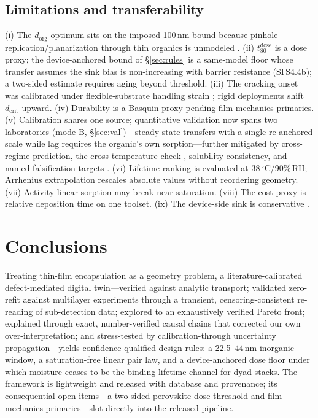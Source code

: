 \documentclass[11pt]{article}
\newcommand{\dorg}{d_{\mathrm{org}}}
\newcommand{\tdose}{t_{80}^{\mathrm{dose}}}
\begin{document}
\subsection{Limitations and transferability}\label{sec:lim}
(i) The $\dorg$ optimum sits on the imposed 100\,nm bound because pinhole replication/planarization through thin organics is unmodeled \cite{coclite2012}. (ii) $\tdose$ is a dose proxy; the device-anchored bound of \S\ref{sec:rules} is a same-model floor whose transfer assumes the sink bias is non-increasing with barrier resistance (SI\,S4.4b); a two-sided estimate requires aging beyond threshold. (iii) The cracking onset was calibrated under flexible-substrate handling strain \cite{wu2018}; rigid deployments shift $d_{\mathrm{crit}}$ upward. (iv) Durability is a Basquin proxy pending film-mechanics primaries. (v) Calibration shares one source; quantitative validation now spans two laboratories (mode-B, \S\ref{sec:val})---steady state transfers with a single re-anchored scale while lag requires the organic's own sorption---further mitigated by cross-regime prediction, the cross-temperature check \cite{choi2018}, solubility consistency, and named falsification targets \cite{lee2018}. (vi) Lifetime ranking is evaluated at 38\,$^{\circ}$C/90\%\,RH; Arrhenius extrapolation rescales absolute values without reordering geometry. (vii) Activity-linear sorption may break near saturation. (viii) The cost proxy is relative deposition time on one toolset. (ix) The device-side sink is conservative \cite{rossi1993}.

\section{Conclusions}
Treating thin-film encapsulation as a geometry problem, a literature-calibrated defect-mediated digital twin---verified against analytic transport; validated zero-refit against multilayer experiments through a transient, censoring-consistent re-reading of sub-detection data; explored to an exhaustively verified Pareto front; explained through exact, number-verified causal chains that corrected our own over-interpretation; and stress-tested by calibration-through uncertainty propagation---yields confidence-qualified design rules: a 22.5--44\,nm inorganic window, a saturation-free linear pair law, and a device-anchored dose floor under which moisture ceases to be the binding lifetime channel for dyad stacks. The framework is lightweight and released with database and provenance; its consequential open items---a two-sided perovskite dose threshold and film-mechanics primaries---slot directly into the released pipeline.
\end{document}
